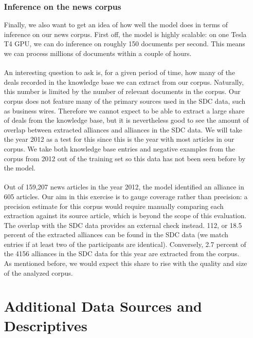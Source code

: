 \subsubsection{Inference on the news corpus}
Finally, we also want to get an idea of how well the model does in terms of inference on our news corpus. First off, the model is highly scalable: on one Tesla T4 GPU, we can do inference on roughly 150 documents per second. This means we can process millions of documents within a couple of hours. \\\\
An interesting question to ask is, for a given period of time, how many of the deals recorded in the knowledge base we can extract from our corpus. Naturally, this number is limited by the number of relevant documents in the corpus. Our corpus does not feature many of the primary sources used in the SDC data, such as business wires. Therefore we cannot expect to be able to extract a large share of deals from the knowledge base, but it is nevertheless good to see the amount of overlap between extracted alliances and alliances in the SDC data. We will take the year 2012 as a test for this since this is the year with most articles in our corpus. We take both knowledge base entries and negative examples from the corpus from 2012 out of the training set so this data has not been seen before by the model. \\\\
Out of 159,207 news articles in the year 2012, the model identified an alliance in 605 articles. Our aim in this exercise is to gauge coverage rather than precision: a precision estimate for this corpus would require manually comparing each extraction against its source article, which is beyond the scope of this evaluation. The overlap with the SDC data provides an external check instead. 112, or 18.5 percent of the extracted alliances can be found in the SDC data (we match entries if at least two of the participants are identical). Conversely, 2.7 percent of the 4156 alliances in the SDC data for this year are extracted from the corpus. As mentioned before, we would expect this share to rise with the quality and size of the analyzed corpus.

\FloatBarrier


\section{Additional Data Sources and Descriptives}
\label{sec:app-data}


